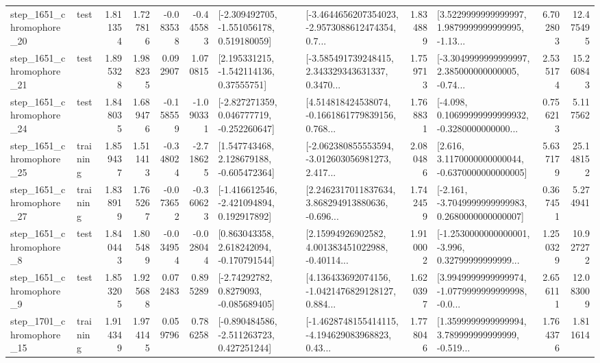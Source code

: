 \begin{tabular}{llrrrrllrlrr}
 step\_1651\_chromophore\_20 &      test &      1.811354 &    1.727816 &     -0.083538 & -0.445583 &   [-2.309492705, -1.551056178, 0.519180059] &  [-3.4644656207354023, -2.9573088612474354, 0.7... &       1.834889 &  [3.5229999999999997, 1.9879999999999995, -1.13... &            6.702803 &         12.475495 \\
 step\_1651\_chromophore\_21 &      test &      1.895328 &    1.988235 &      0.092907 &  1.070815 &     [2.195331215, -1.542114136, 0.37555751] &  [-3.585491739248415, 2.343329343631337, 0.3470... &       1.759713 &  [-3.3049999999999997, 2.385000000000005, -0.74... &            2.535174 &         15.260843 \\
 step\_1651\_chromophore\_24 &      test &      1.848035 &    1.689476 &     -0.158559 & -1.090331 &   [-2.827271359, 0.046777719, -0.252260647] &  [4.514818424538074, -0.1661861779839156, 0.768... &       1.768831 &  [-4.098, 0.10699999999999932, -0.3280000000000... &            0.756213 &          5.117562 \\
 step\_1651\_chromophore\_25 &  training &      1.859437 &    1.511413 &     -0.348024 & -2.718625 &    [1.547743468, 2.128679188, -0.605472364] &  [-2.062380855553594, -3.012603056981273, 2.417... &       2.080486 &   [2.616, 3.1170000000000044, -0.6370000000000005] &            5.637179 &         25.148152 \\
 step\_1651\_chromophore\_27 &  training &      1.838919 &    1.765267 &     -0.073652 & -0.360623 &   [-1.416612546, -2.421094894, 0.192917892] &  [2.2462317011837634, 3.868294913880636, -0.696... &       1.742459 &  [-2.161, -3.7049999999999983, 0.2680000000000007] &            0.367451 &          5.274941 \\
  step\_1651\_chromophore\_8 &      test &      1.840443 &    1.805489 &     -0.034954 & -0.028044 &    [0.863043358, 2.618242094, -0.170791544] &  [2.15994926902582, 4.001383451022988, -0.40114... &       1.910002 &  [-1.2530000000000001, -3.996, 0.32799999999999... &            1.250329 &         10.927272 \\
  step\_1651\_chromophore\_9 &      test &      1.853205 &    1.925688 &      0.072483 &  0.895289 &      [-2.74292782, 0.8279093, -0.085689405] &  [4.136433692074156, -1.0421476829128127, 0.884... &       1.620397 &  [3.9949999999999974, -1.0779999999999998, -0.0... &            2.656111 &         12.083009 \\
 step\_1701\_chromophore\_15 &  training &      1.914349 &    1.974145 &      0.059796 &  0.786258 &   [-0.890484586, -2.511263723, 0.427251244] &  [-1.4628748155414115, -4.194629083968823, 0.43... &       1.778046 &  [1.3599999999999994, 3.789999999999999, -0.519... &            1.764376 &          1.811614 \\

\end{tabular}
